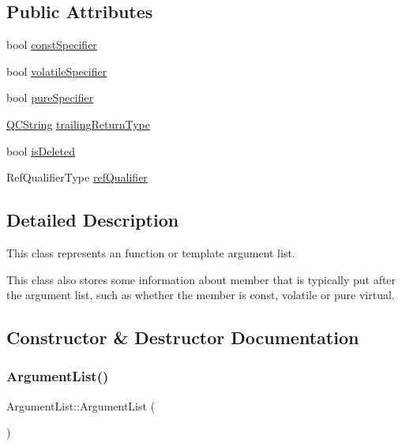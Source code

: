 \subsection*{Public Attributes}
\begin{DoxyCompactItemize}
\item 
bool \mbox{\hyperlink{class_argument_list_ae466c241240301ea30065310134ab639}{const\+Specifier}}
\item 
bool \mbox{\hyperlink{class_argument_list_ae058c8cda0c6ce8837aab723e0af62bd}{volatile\+Specifier}}
\item 
bool \mbox{\hyperlink{class_argument_list_a3f023c090551e0ecaa588b25f895c047}{pure\+Specifier}}
\item 
\mbox{\hyperlink{class_q_c_string}{Q\+C\+String}} \mbox{\hyperlink{class_argument_list_ac41ea581a7578480e4bed0d6c5e1af78}{trailing\+Return\+Type}}
\item 
bool \mbox{\hyperlink{class_argument_list_a0fd4d40dd62fb9f798d99cb63f966183}{is\+Deleted}}
\item 
Ref\+Qualifier\+Type \mbox{\hyperlink{class_argument_list_a007abb992ff51e8e205423ce9af1fce2}{ref\+Qualifier}}
\end{DoxyCompactItemize}


\subsection{Detailed Description}
This class represents an function or template argument list. 

This class also stores some information about member that is typically put after the argument list, such as whether the member is const, volatile or pure virtual. 

\subsection{Constructor \& Destructor Documentation}
\mbox{\label{class_argument_list_a2f46f024604fbd06eb4f2d18f97f74c0}} 
\subsubsection{\texorpdfstring{ArgumentList()}{ArgumentList()}}
{\footnotesize\ttfamily Argument\+List\+::\+Argument\+List (\begin{DoxyParamCaption}{ }\end{DoxyParamCaption})\hspace{0.3cm}{\ttfamily [inline]}}

